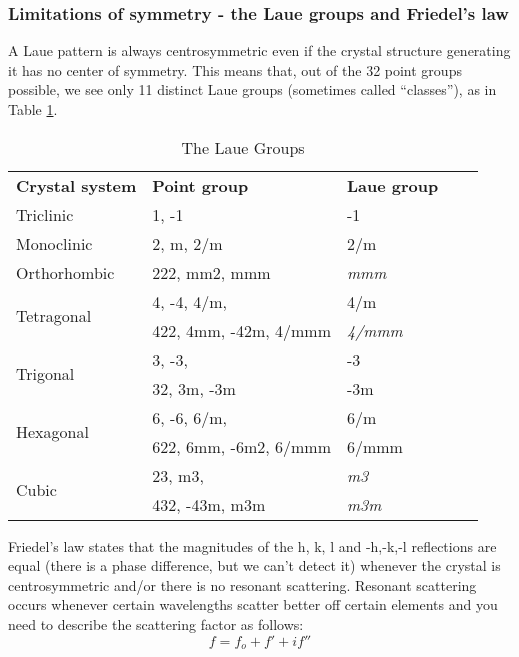 \subsubsection{Limitations of symmetry - the Laue groups and Friedel’s law}
A Laue pattern is always centrosymmetric even if the crystal structure generating it has no center of symmetry. This means that, out of the 32 point groups possible, we see only 11 distinct Laue groups (sometimes called “classes”), as in Table \ref{LaueGroups}.
\begin{table}[]
\caption{The Laue Groups}
\begin{tabular}{lllll}
\textbf{Crystal   system}   & \textbf{Point group}  & \textbf{Laue group} &  &  \\
Triclinic                   & 1, -1                 & -1                  &  &  \\
Monoclinic                  & 2, m, 2/m             & 2/m                 &  &  \\
Orthorhombic                & 222, mm2, mmm         & \textit{mmm}        &  &  \\
\multirow{2}{*}{Tetragonal} & 4, -4, 4/m,           & 4/m                 &  &  \\
                            & 422, 4mm, -42m, 4/mmm & \textit{4/mmm}      &  &  \\
\multirow{2}{*}{Trigonal}   & 3, -3,                & -3                  &  &  \\
                            & 32, 3m, -3m           & -3m                 &  &  \\
\multirow{2}{*}{Hexagonal}  & 6, -6, 6/m,           & 6/m                 &  &  \\
                            & 622, 6mm, -6m2, 6/mmm & 6/mmm               &  &  \\
\multirow{2}{*}{Cubic}      & 23, m3,               & \textit{m3}         &  &  \\
                            & 432, -43m, m3m        & \textit{m3m}        &  & 
\end{tabular}
\label{LaueGroups}
\end{table}
Friedel's law states that the magnitudes of the h, k, l and -h,-k,-l reflections are equal (there is a phase difference, but we can’t detect it) whenever the crystal is centrosymmetric and/or there is no resonant scattering. Resonant scattering occurs whenever certain wavelengths scatter better off certain elements and you need to describe the scattering factor as follows:
\begin{equation}
    f=f_o+f'+if''
    \label{Friedel'sLaw}
\end{equation}

